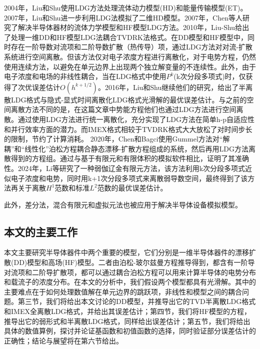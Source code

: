 2004年，Liu和Shu使用LDG方法处理流体动力模型(HD)和能量传输模型(ET)\cite{liu2004locala}。2007年，Liu和Shu进一步利用LDG法模拟了二维HD模型\cite{liu2007localb}。2007年，Chen等人研究了解决半导体器材的流体力学模型和HF模型LDG方法\cite{chen2007discontinuous}。2010年，Liu-Shu给出了处理一维DD和HF模型LDG法耦合TVDRK法格式\cite{liu2010error}。在DD模型和HF模型中，同时存在一阶导数对流项和二阶导数扩散（热传导）项，通过LDG方法对对流-扩散系统进行空间离散。但该方法仅对电子浓度方程进行离散化，对于电势方程，仍然使用连续方法，以避免在单元边界上出现两个独立解变量的不连续性。此外，由于电子浓度和电场的非线性耦合，当在LDG格式中使用$P^k$(k次分段多项式)时，仅获得了次优误差估计$O(h^{k+1/2})$。2016年，Liu和Shu继续他们的研究，给出了半离散LDG格式与隐式-显式时间离散化LDG格式光滑解的最优误差估计\cite{liu2016analysis}。与之前的空间离散方法不同的是，在这篇文章中势能方程他们也通过LDG方法进行空间离散。通过使用LDG方法进行统一离散化，充分实现了LDG方法在简单h-p自适应性和并行效率方面的潜力。而IMEX格式相较于TVDRK格式大大放松了对时间步长的限制，节约了计算消耗。
2020年，Chen和Bagci使用Gummel方法对“解耦”和“线性化”泊松方程耦合静态漂移-扩散方程组成的系统，然后再用LDG方法离散得到的方程组\cite{chen2020steady}。通过与基于有限元和有限体积的模拟软件相比，证明了其准确性。2024年，Li等研究了一种弱伽辽金有限元方法，该方法利用k次分段多项式近似电子浓度和电势，同时用k+1次分段多项式来离散弱导数空间，最终得到了该方法再关于离散$H^1$范数和标准$L^2$范数的最优误差估计。

此外，差分法\cite{ding2019optimal}，混合有限元\cite{gao2018linearized}和虚拟元法\cite{liu2021virtual}也被应用于解决半导体设备模拟模型。
\subsection{本文的主要工作}
本文主要研究半导体器件中两个重要的模型，它们分别是一维半导体器件的漂移扩散(DD)模型和高场(HF)模型。二者由泊松-玻尔兹曼方程推导得到，都含有一阶导对流项和二阶导扩散项，都可以通过耦合泊松方程可以用来计算半导体的电势分布和载流子的浓度分布。在本文的分析中，我们假设两个模型都具有光滑解。其中的主要难点在于如何处理数值解在单元边界的跳跃项，非线性和模型之间的耦合问题。第三节，我们将给出本文讨论的DD模型，并推导出它的TVD半离散LDG格式和IMEX全离散LDG格式，并给出其误差估计；第四节，我们将HF模型的方程，推导出它的弱形式和半离散LDG格式，同样给出误差估计；第五节，我们将给出具体的数值算例，探讨并论证基函数和初值函数的选择，同时验证部分误差估计的正确性；结论与展望将在第六节给出。
